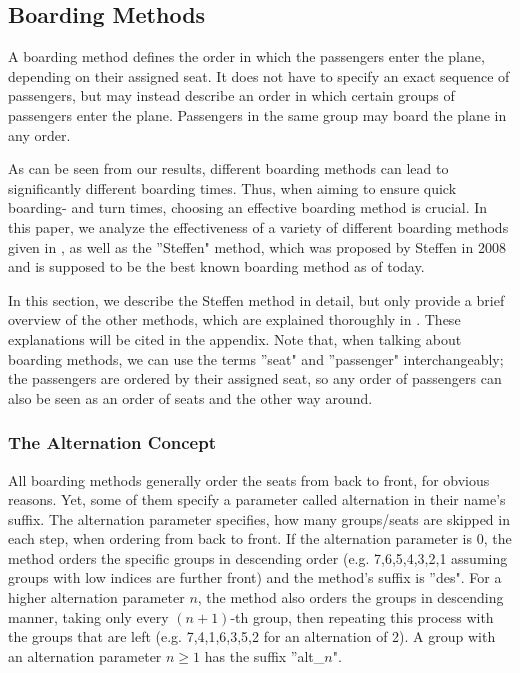 \documentclass[11pt]{article}
\begin{document}
\subsection{Boarding Methods}
A boarding method defines the order in which the passengers enter the plane, depending on their assigned seat. It does not have to specify an exact sequence of passengers, but may instead describe an order in which certain groups of passengers enter the plane. Passengers in the same group may board the plane in any order. 


As can be seen from our results, different boarding methods can lead to significantly different boarding times. Thus, when aiming to ensure quick boarding- and turn times, choosing an effective boarding method is crucial. In this paper, we analyze the effectiveness of a variety of different boarding methods given in \cite{beus}, as well as the ''Steffen" method, which was proposed by Steffen \cite{steffen} in 2008 and is supposed to be the best known boarding method as of today.



In this section, we describe the Steffen method in detail, but only provide a brief overview of the other methods, which are explained thoroughly in \cite{beus}. These explanations will be cited in the appendix. Note that, when talking about boarding methods, we can use the terms ''seat" and ''passenger" interchangeably; the passengers are ordered by their assigned seat, so any order of passengers can also be seen as an order of seats and the other way around.


\subsubsection{The Alternation Concept}

All boarding methods generally order the seats from back to front, for obvious reasons. Yet, some of them specify a parameter called alternation in their name's suffix. The alternation parameter specifies, how many groups/seats are skipped in each step, when ordering from back to front. If the alternation parameter is 0, the method orders the specific groups in descending order (e.g. 7,6,5,4,3,2,1 assuming groups with low indices are further front) and the method's suffix is ''des". For a higher alternation parameter $n$, the method also orders the groups in descending manner, taking only every $(n+1)$-th group, then repeating this process with the groups that are left (e.g. 7,4,1,6,3,5,2 for an alternation of 2). A group with an alternation parameter $n \geq 1$ has the suffix ''alt\_$n$".
\end{document}
